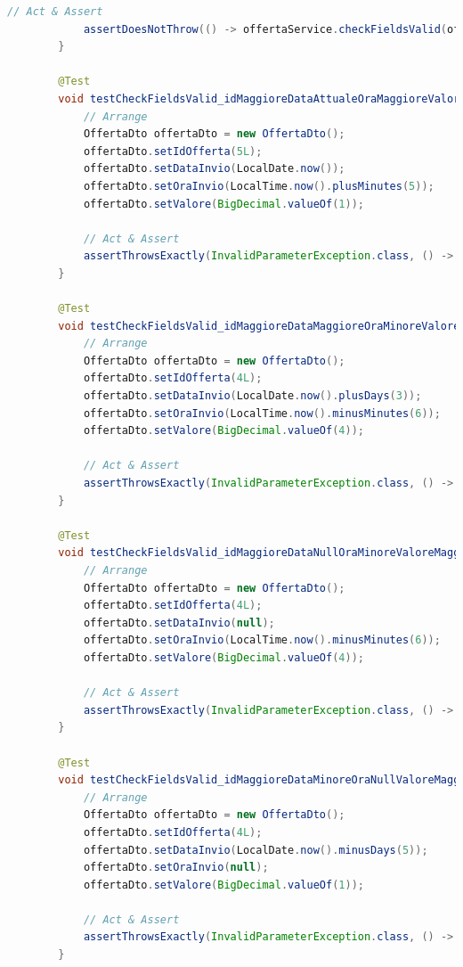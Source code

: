 \begin{lstlisting}[language=Java, caption=OffertaServiceTests.java]
            // Act & Assert
            assertDoesNotThrow(() -> offertaService.checkFieldsValid(offertaDto));
        }
    
        @Test
        void testCheckFieldsValid_idMaggioreDataAttualeOraMaggioreValoreMaggiore() {
            // Arrange
            OffertaDto offertaDto = new OffertaDto();
            offertaDto.setIdOfferta(5L);
            offertaDto.setDataInvio(LocalDate.now());
            offertaDto.setOraInvio(LocalTime.now().plusMinutes(5));
            offertaDto.setValore(BigDecimal.valueOf(1));
    
            // Act & Assert
            assertThrowsExactly(InvalidParameterException.class, () -> offertaService.checkFieldsValid(offertaDto));
        }
    
        @Test
        void testCheckFieldsValid_idMaggioreDataMaggioreOraMinoreValoreMaggiore() {
            // Arrange
            OffertaDto offertaDto = new OffertaDto();
            offertaDto.setIdOfferta(4L);
            offertaDto.setDataInvio(LocalDate.now().plusDays(3));
            offertaDto.setOraInvio(LocalTime.now().minusMinutes(6));
            offertaDto.setValore(BigDecimal.valueOf(4));
    
            // Act & Assert
            assertThrowsExactly(InvalidParameterException.class, () -> offertaService.checkFieldsValid(offertaDto));
        }
    
        @Test
        void testCheckFieldsValid_idMaggioreDataNullOraMinoreValoreMaggiore() {
            // Arrange
            OffertaDto offertaDto = new OffertaDto();
            offertaDto.setIdOfferta(4L);
            offertaDto.setDataInvio(null);
            offertaDto.setOraInvio(LocalTime.now().minusMinutes(6));
            offertaDto.setValore(BigDecimal.valueOf(4));
    
            // Act & Assert
            assertThrowsExactly(InvalidParameterException.class, () -> offertaService.checkFieldsValid(offertaDto));
        }
    
        @Test
        void testCheckFieldsValid_idMaggioreDataMinoreOraNullValoreMaggiore() {
            // Arrange
            OffertaDto offertaDto = new OffertaDto();
            offertaDto.setIdOfferta(4L);
            offertaDto.setDataInvio(LocalDate.now().minusDays(5));
            offertaDto.setOraInvio(null);
            offertaDto.setValore(BigDecimal.valueOf(1));
    
            // Act & Assert
            assertThrowsExactly(InvalidParameterException.class, () -> offertaService.checkFieldsValid(offertaDto));
        }
    

\end{lstlisting}
